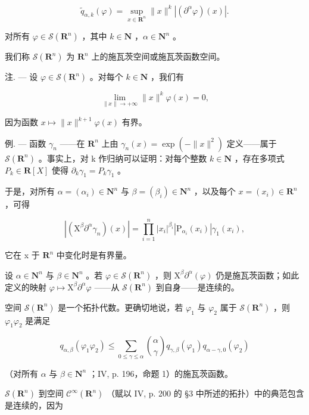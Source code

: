 \[
\widetilde {q} _ {\alpha , k} (\varphi) = \sup _ {x \in \mathbf {R} ^ {n}} \| x \| ^ {k} | (\partial^ {\alpha} \varphi) (x) |.
\]

对所有 \(\varphi\in\mathcal{S}(\mathbf{R}^{n})\) ，其中 \(k\in\mathbf{N}\) ，\(\alpha\in\mathbf{N}^{n}\) 。

我们称 \(\mathcal{S}(\mathbf{R}^{n})\) 为 \(\mathbf{R}^{n}\) 上的施瓦茨空间或施瓦茨函数空间。

注. --- 设 \(\varphi\in\mathcal{S}(\mathbf{R}^{n})\) 。对每个 \(k\in\mathbf{N}\) ，我们有

\[
\lim _ {\| x \| \to + \infty} \| x \| ^ {k} \varphi (x) = 0,
\]

因为函数 \(x \mapsto \|x\|^{k+1} \varphi(x)\) 有界。

例. --- 函数 \(\gamma_{n}\) ——在 \(\mathbf{R}^{n}\) 上由 \(\gamma_{n}(x)=\exp(-\|x\|^{2})\) 定义——属于 \(\mathcal{S}(\mathbf{R}^{n})\) 。事实上，对 k 作归纳可以证明：对每个整数 \(k\in \mathbf{N}\) ，存在多项式 \(P_{k}\in\mathbf{R}[X]\) 使得 \(\partial_{k}\gamma_{1}=P_{k}\gamma_{1}\) 。

于是，对所有 \(\alpha = (\alpha_{i})\in \mathbf{N}^{n}\) 与 \(\beta = (\beta_{i})\in \mathbf{N}^{n}\) ，以及每个 \(x = (x_{i})\in \mathbf{R}^{n}\) ，可得

\[
| (\mathrm{X} ^ {\beta} \partial^ {\alpha} \gamma_ {n}) (x) | = \prod_ {i = 1} ^ {n} | x _ {i} | ^ {\beta_ {i}} | \mathrm{P} _ {\alpha_ {i}} (x _ {i}) | \gamma_ {1} (x _ {i}),
\]

它在 x 于 \(\mathbf{R}^{n}\) 中变化时是有界量。

设 \(\alpha \in \mathbf{N}^n\) 与 \(\beta \in \mathbf{N}^n\) 。若 \(\varphi \in \mathcal{S}(\mathbf{R}^n)\) ，则 \(\mathrm{X}^{\beta}\partial^{\alpha}(\varphi)\) 仍是施瓦茨函数；如此定义的映射 \(\varphi \mapsto \mathrm{X}^{\beta}\partial^{\alpha}\varphi\) ——从 \(\mathcal{S}(\mathbf{R}^n)\) 到自身——是连续的。

空间 \(\mathcal{S}(\mathbf{R}^{n})\) 是一个拓扑代数。更确切地说，若 \(\varphi_{1}\) 与 \(\varphi_{2}\) 属于 \(\mathcal{S}(\mathbf{R}^{n})\) ，则 \(\varphi_{1}\varphi_{2}\) 是满足

\[
q _ {\alpha , \beta} (\varphi_ {1} \varphi_ {2}) \leqslant \sum_ {0 \leqslant \gamma \leqslant \alpha} \binom{\alpha}{\gamma} q _ {\gamma , \beta} (\varphi_ {1}) q _ {\alpha - \gamma , 0} (\varphi_ {2})\tag{2}
\]

（对所有 \(\alpha\) 与 \(\beta \in \mathbf{N}^n\) ；IV, p. 196，命题 1）的施瓦茨函数。

\(\mathcal{S}(\mathbf{R}^{n})\) 到空间 \(\mathcal{C}^{\infty}(\mathbf{R}^{n})\) （赋以 IV, p. 200 的 §3 中所述的拓扑）中的典范包含是连续的，因为

